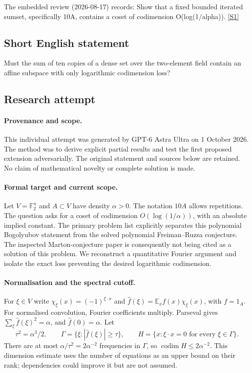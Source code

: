 \documentclass[11pt,a4paper]{article}
\newcommand{\F}{\mathbb{F}}
\newcommand{\E}{\mathbb{E}}
\newcommand{\sref}[2]{\hyperlink{source:#1:#2}{[S#2]}}
\begin{document}
The embedded review (2026-08-17) records: Show that a fixed bounded iterated sumset, specifically 10A, contains a coset of codimension O(log(1/alpha)). \sref{statement}{1}

\subsection{Short English statement}

Must the sum of ten copies of a dense set over the two-element field contain an affine subspace with only logarithmic codimension loss?

\subsection{Research attempt}

\paragraph{Provenance and scope.}
This individual attempt was generated by GPT-6 Astra Ultra on 1 October 2026. The method was to derive explicit partial results and test the first proposed extension adversarially. The original statement and sources below are retained. No claim of mathematical novelty or complete solution is made.

\paragraph{Formal target and current scope.}
Let $V=\F_2^n$ and $A\subset V$ have density $\alpha>0$. The notation $10A$ allows repetitions. The question asks for a coset of codimension $O(\log(1/\alpha))$, with an absolute implied constant. The primary problem list explicitly separates this polynomial Bogolyubov statement from the solved polynomial Freiman--Ruzsa conjecture. The inspected Marton-conjecture paper is consequently not being cited as a solution of this problem. We reconstruct a quantitative Fourier argument and isolate the exact loss preventing the desired logarithmic codimension.

\paragraph{Normalisation and the spectral cutoff.}
For $\xi\in V$ write $\chi_\xi(x)=(-1)^{\xi\cdot x}$ and $\widehat f(\xi)=\E_xf(x)\chi_\xi(x)$, with $f=1_A$. For normalised convolution, Fourier coefficients multiply. Parseval gives $\sum_\xi\widehat f(\xi)^2=\alpha$, and $\widehat f(0)=\alpha$. Let
\[
 \tau^2=\alpha^3/2,\qquad
 \Gamma=\{\xi:|\widehat f(\xi)|\geq\tau\},\qquad
 H=\{x:\xi\cdot x=0\text{ for every }\xi\in\Gamma\}.
\]
There are at most $\alpha/\tau^2=2\alpha^{-2}$ frequencies in $\Gamma$, so $\operatorname{codim}H\leq2\alpha^{-2}$. This dimension estimate uses the number of equations as an upper bound on their rank; dependencies could improve it but are not assumed.
\end{document}

